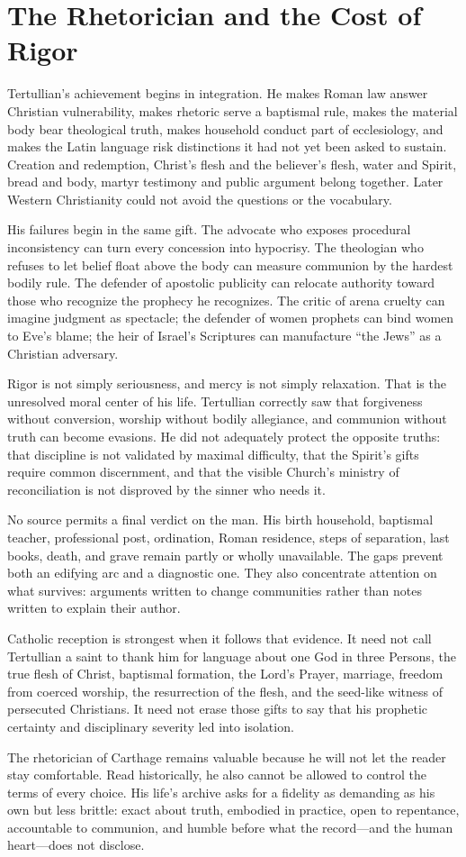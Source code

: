 \section{The Rhetorician and the Cost of Rigor}

Tertullian's achievement begins in integration. He makes Roman law answer
Christian vulnerability, makes rhetoric serve a baptismal rule, makes the
material body bear theological truth, makes household conduct part of
ecclesiology, and makes the Latin language risk distinctions it had not yet
been asked to sustain. Creation and redemption, Christ's flesh and the believer's
flesh, water and Spirit, bread and body, martyr testimony and public argument
belong together. Later Western Christianity could not avoid the questions or
the vocabulary.

His failures begin in the same gift. The advocate who exposes procedural
inconsistency can turn every concession into hypocrisy. The theologian who
refuses to let belief float above the body can measure communion by the hardest
bodily rule. The defender of apostolic publicity can relocate authority toward
those who recognize the prophecy he recognizes. The critic of arena cruelty can
imagine judgment as spectacle; the defender of women prophets can bind women to
Eve's blame; the heir of Israel's Scriptures can manufacture ``the Jews'' as a
Christian adversary.

Rigor is not simply seriousness, and mercy is not simply relaxation. That is
the unresolved moral center of his life. Tertullian correctly saw that
forgiveness without conversion, worship without bodily allegiance, and
communion without truth can become evasions. He did not adequately protect the
opposite truths: that discipline is not validated by maximal difficulty, that
the Spirit's gifts require common discernment, and that the visible Church's
ministry of reconciliation is not disproved by the sinner who needs it.

No source permits a final verdict on the man. His birth household, baptismal
teacher, professional post, ordination, Roman residence, steps of separation,
last books, death, and grave remain partly or wholly unavailable. The gaps
prevent both an edifying arc and a diagnostic one. They also concentrate
attention on what survives: arguments written to change communities rather
than notes written to explain their author.

Catholic reception is strongest when it follows that evidence. It need not call
Tertullian a saint to thank him for language about one God in three Persons, the
true flesh of Christ, baptismal formation, the Lord's Prayer, marriage, freedom
from coerced worship, the resurrection of the flesh, and the seed-like witness
of persecuted Christians. It need not erase those gifts to say that his
prophetic certainty and disciplinary severity led into isolation.

The rhetorician of Carthage remains valuable because he will not let the reader
stay comfortable. Read historically, he also cannot be allowed to control the
terms of every choice. His life's archive asks for a fidelity as demanding as
his own but less brittle: exact about truth, embodied in practice, open to
repentance, accountable to communion, and humble before what the record---and
the human heart---does not disclose.
